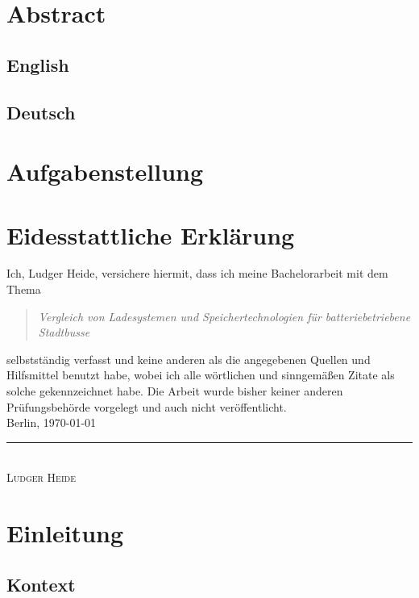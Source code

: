 \documentclass[twoside]{scrreprt}
\begin{document}
\chapter*{Abstract}
\section*{English}
\section*{Deutsch}

\chapter*{Aufgabenstellung}

\chapter*{Eidesstattliche Erklärung}
Ich, Ludger Heide, versichere hiermit, dass ich meine Bachelorarbeit mit dem Thema
\begin{quote}
	\emph{Vergleich von Ladesystemen und Speichertechnologien für batteriebetriebene Stadtbusse}
\end{quote}
selbstständig verfasst und keine anderen als die angegebenen Quellen und Hilfsmittel benutzt habe, wobei ich alle wörtlichen und sinngemäßen Zitate als solche gekennzeichnet habe. Die Arbeit wurde bisher keiner anderen Prüfungsbehörde vorgelegt und auch nicht veröffentlicht.\\[6ex]
Berlin, \today\\
\newline
\rule{4cm}{0.5pt}\\
\textsc{Ludger Heide} 

\tableofcontents

\listoffigures
{}

\listoftables
{}
\newpage

\chapter{Einleitung}
\section{Kontext} %
\end{document}
